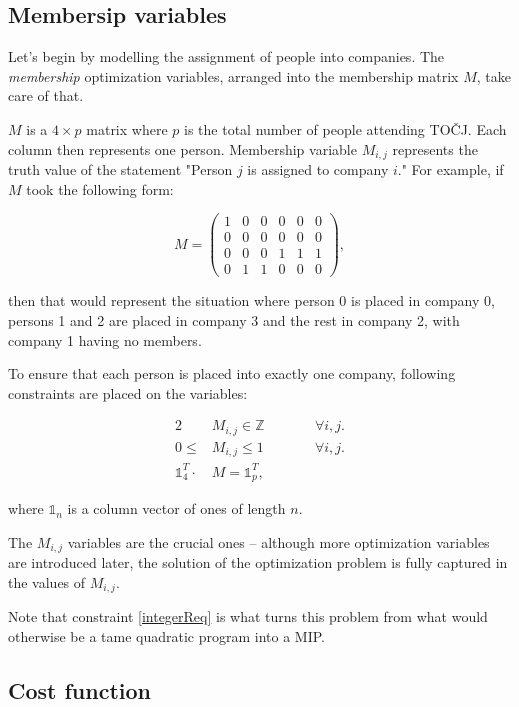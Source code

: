 \documentclass[11pt]{article}
\begin{document}
\subsection{Membersip variables}

Let's begin by modelling the assignment of people into companies.  The \emph{membership} optimization variables, arranged 
into the membership matrix $M$, take care of that.

$M$ is a $4\times{}p$ matrix where $p$ is the total number of people attending TOČJ.  Each column then represents one person.  Membership variable $M_{i,j}$
represents the truth value of the statement "Person $j$ is assigned to company $i$."  For example, if $M$ took the following form:

\[
M = \begin{pmatrix}
1 & 0 & 0 & 0 & 0 & 0 \\
0 & 0 & 0 & 0 & 0 & 0 \\
0 & 0 & 0 & 1 & 1 & 1 \\
0 & 1 & 1 & 0 & 0 & 0
\end{pmatrix},
\]

\noindent then that would represent the situation where person 0 is placed in company 0, persons 1 and 2 are placed in company 3 and the rest in company 2, with
company 1 having no members.

To ensure that each person is placed into exactly one company, following constraints are placed on the variables:

\begin{alignat}{2}
    &M_{i,j} \in \mathbb{Z} \quad \quad &&\forall i, j. \label{integerReq} \\
    0 \leq &M_{i,j} \leq 1 &&\forall i, j. \\
    \mathbb{1}^{T}_4 \cdot &M = \mathbb{1}^{T}_p,
\end{alignat}

where $\mathbb{1}_n$ is a column vector of ones of length $n$.

The $M_{i,j}$ variables are the crucial ones -- although more optimization variables are introduced later, the solution of the optimization problem is 
fully captured in the values of $M_{i,j}$.  

Note that constraint \ref{integerReq} is what turns this problem from what would otherwise be a tame quadratic program into a MIP.

\subsection{Cost function}
\end{document}

